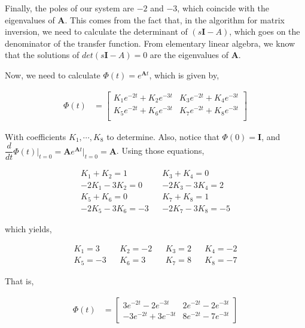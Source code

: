 \documentclass[12pt]{article}
\begin{document}
		Finally, the poles of our system are $-2$ and $-3$, which coincide with the eigenvalues of $\mathbf{A}$. This comes from the fact that, in the algorithm for matrix inversion, we need to calculate the determinant of $(s\mathbf{I}-A)$, which goes on the denominator of the transfer function. From elementary linear algebra, we know that the solutions of $det(s\mathbf{I}-A) = 0$ are the eigenvalues of $\mathbf{A}$.
		
		Now, we need to calculate $\Phi(t) = e^{\mathbf{A}t}$, which is given by,
		
		\begin{align*}
			\Phi(t) &= \begin{bmatrix}
				K_{1}e^{-2t} + K_{2}e^{-3t} & K_{3}e^{-2t} + K_{4}e^{-3t}\\
				K_{5}e^{-2t} + K_{6}e^{-3t} & K_{7}e^{-2t} + K_{8}e^{-3t}\\
			\end{bmatrix}
		\end{align*}
		
		With coefficients $K_{1},\cdots,K_{8}$ to determine. Also, notice that $\Phi(0) = \mathbf{I}$, and $\dfrac{d}{dt}\Phi(t)\biggr\vert_{t = 0} = \mathbf{A}e^{\mathbf{A}t}\biggr\vert_{t = 0} = \mathbf{A}$. Using those equations,
		
		\begin{align*}
			&K_{1} + K_{2} = 1& &K_{3}+K_{4} = 0&\\
			&-2K_{1}-3K_{2} = 0& &-2K_{3}-3K_{4}= 2&\\
			&K_{5} + K_{6} = 0& &K_{7}+K_{8} = 1&\\
			&-2K_{5} - 3K_{6} = -3& &-2K_{7}-3K_{8} = -5&
		\end{align*}
		
		which yields,
		
		\begin{align*}
			&K_{1} = 3& &K_{2} = -2& &K_{3} = 2& &K_{4} = -2& \\
			&K_{5} = -3& &K_{6} = 3& &K_{7} = 8& &K_{8} = -7&
		\end{align*}
		
		That is,
		
		\begin{align*}
			\Phi(t) &= \begin{bmatrix}
				3e^{-2t}-2e^{-3t} & 2e^{-2t} - 2e^{-3t}\\
				-3e^{-2t}+3e^{-3t} & 8e^{-2t} - 7e^{-3t}
			\end{bmatrix}
		\end{align*}
		
\end{document}
